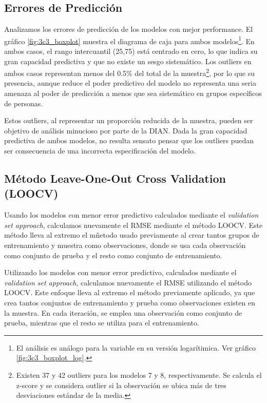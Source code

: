 \documentclass[11pt,oneside]{article}
\begin{document}
	\subsection{Errores de Predicción}

    Analizamos los errores de predicción de los modelos con mejor performance. El gráfico \ref{fig:3c3_boxplot} muestra el diagrama de caja para ambos modelos\footnote{ El análisis es análogo para la variable en su versión logarítimica. Ver gráfico \ref{fig:3c3_boxplot_log}.}. En ambos casos, el rango intercuantil (25,75) está centrado en cero, lo que indica su gran capacidad predictiva y que no existe un sesgo sistemático. Los outliers en ambos casos representan menos del 0.5\% del total de la muestra\footnote{Existen 37 y 42 outliers para los modelos 7 y 8, respectivamente. Se calcula el z-score y se considera outlier si la observación se ubica más de tres desviaciones estándar de la media.}, por lo que su presencia, aunque reduce el poder predictivo del modelo no representa una seria amenaza al poder de predicción a menos que sea sistemático en grupos específicos de personas.

    Estos outliers, al representar un proporción reducida de la muestra, pueden ser objetivo de análisis minucioso por parte de la DIAN. Dada la gran capacidad predictiva de ambos modelos, no resulta sensato pensar que los outliers puedan ser consecuencia de una incorrecta especificación del modelo.

	\subsection{Método Leave-One-Out Cross Validation (LOOCV)}
	
	Usando los modelos con menor error predictivo calculados mediante el \textit{validation set approach}, calculamos nuevamente el RMSE mediante el método LOOCV. Este método lleva al extremo el mñetodo usado previamente al crear tantos grupos de entrenamiento y muestra como observaciones, donde se usa cada observación como conjunto de prueba y el resto como conjunto de entrenamiento.

    Utilizando los modelos con menor error predictivo, calculados mediante el \textit{validation set approach}, calculamos nuevamente el RMSE utilizando el método LOOCV. Este enfoque lleva al extremo el método previamente aplicado, ya que crea tantos conjuntos de entrenamiento y prueba como observaciones existen en la muestra. En cada iteración, se emplea una observación como conjunto de prueba, mientras que el resto se utiliza para el entrenamiento.
\end{document}

